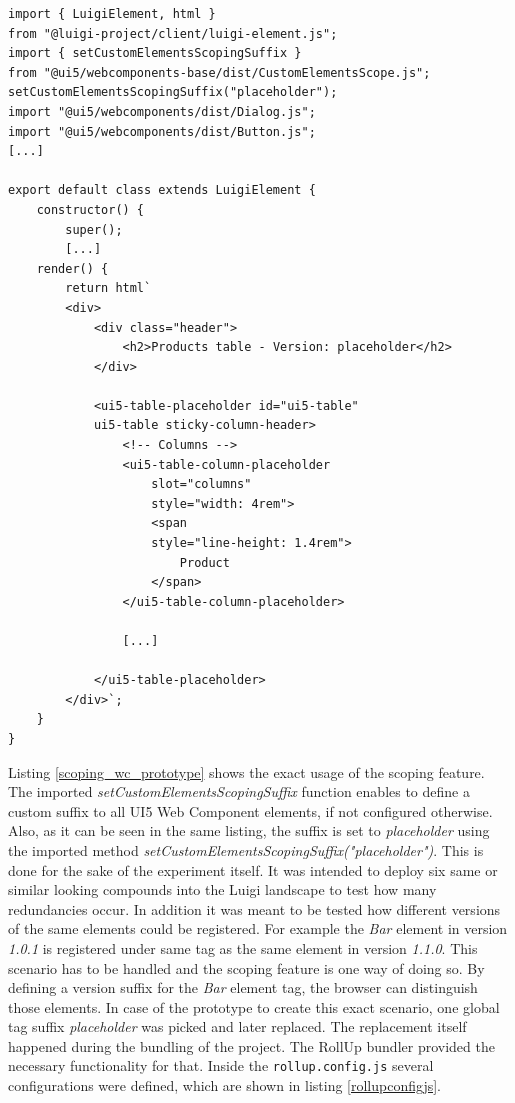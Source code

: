 \begin{lstlisting}[caption=Scoping feature used in the prototype, label=scoping_wc_prototype]
import { LuigiElement, html } 
from "@luigi-project/client/luigi-element.js";
import { setCustomElementsScopingSuffix } 
from "@ui5/webcomponents-base/dist/CustomElementsScope.js";
setCustomElementsScopingSuffix("placeholder");
import "@ui5/webcomponents/dist/Dialog.js";
import "@ui5/webcomponents/dist/Button.js";
[...]

export default class extends LuigiElement {
	constructor() {
		super();
		[...]
	render() {
		return html`
		<div>
			<div class="header">
				<h2>Products table - Version: placeholder</h2>
			</div>
			
			<ui5-table-placeholder id="ui5-table" 
			ui5-table sticky-column-header>
				<!-- Columns -->
				<ui5-table-column-placeholder 
					slot="columns" 
					style="width: 4rem">
					<span 
					style="line-height: 1.4rem">
						Product
					</span>
				</ui5-table-column-placeholder>
				
				[...]
				
			</ui5-table-placeholder>
		</div>`;
	}
}
\end{lstlisting}

Listing \ref{scoping_wc_prototype} shows the exact usage of the scoping feature. 
The imported \textit{setCustomElementsScopingSuffix} function enables to define a custom suffix to all UI5 Web Component elements, if not configured otherwise. Also, as it can be seen in the same listing, the suffix is set to \textit{placeholder} using the imported method 
\textit{setCustomElementsScopingSuffix("placeholder")}.
This is done for the sake of the experiment itself. It was intended to deploy six same or similar looking compounds into the Luigi landscape to test how many redundancies occur. In addition it was meant to be tested how different versions of the same elements could be registered. For example the \textit{Bar} element in version \textit{1.0.1} is registered under same tag as the same element in version \textit{1.1.0}. This scenario has to be handled and the scoping feature is one way of doing so.
By defining a version suffix for the \textit{Bar} element tag, the browser can distinguish those elements.
In case of the prototype to create this exact scenario, one global tag suffix \textit{placeholder} was picked and later replaced. The replacement itself happened during the bundling of the project. The RollUp bundler provided the necessary functionality for that.
Inside the \texttt{rollup.config.js} several configurations were defined, which are shown in listing \ref{rollupconfigjs}.

